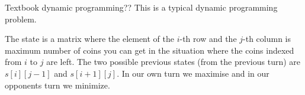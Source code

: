 \documentclass{writeup}
\begin{document}
\begin{solutions}
  \begin{solution}{Textbook dynamic programming}{?}{?}
    This is a typical dynamic programming problem.

    The state is a matrix where the element of the $i$-th row and the $j$-th column is maximum number of coins you can get in the situation where the coins indexed from $i$ to $j$ are left.
    The two possible previous states (from the previous turn) are $s[i][j-1]$ and $s[i+1][j]$.
    In our own turn we maximise and in our opponents turn we minimize.
  \end{solution}
\end{solutions}
\end{document}
